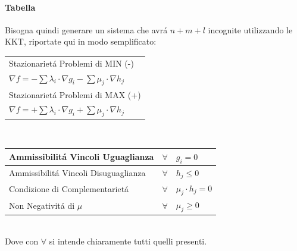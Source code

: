 \documentclass[12pt, a4paper, openany]{book}
\begin{document}
\paragraph{Tabella}
Bisogna quindi generare un sistema che avrá $n+m+l$ incognite utilizzando le KKT,
riportate qui in modo semplificato:\\
\begin{tabularx}{\textwidth}{|Y|}
	\hline
	Stazionarietá Problemi di MIN (-)                                             \\
	$ \nabla f = - \sum \lambda_i \cdot \nabla g_i - \sum \mu_j \cdot \nabla h_j$ \\
	\hline \hline
	Stazionarietá Problemi di MAX (+)                                             \\
	$ \nabla f = + \sum \lambda_i \cdot \nabla g_i + \sum \mu_j \cdot \nabla h_j$ \\
	\hline
\end{tabularx}\\
\begin{tabularx}{\textwidth}{|l|cY|}
	\hline
	Ammissibilitá Vincoli Uguaglianza    & $\forall$  & $ g_i = 0$             \\
	\hline
	Ammissibilitá Vincoli Disuguaglianza & $ \forall$ & $ h_j\leq 0$           \\
	\hline
	Condizione di Complementarietá       & $\forall$  & $ \mu_j \cdot h_j = 0$ \\
	\hline
	Non Negativitá di $\mu$              & $\forall $ & $ \mu_j \geq 0$        \\
	\hline
\end{tabularx}
\\Dove con $\forall$ si intende chiaramente tutti quelli presenti.
\end{document}
